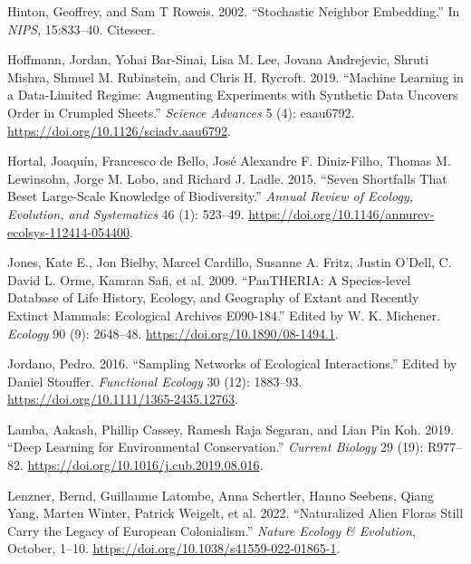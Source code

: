 \documentclass[
  letterpaper,
  DIV=11,
  numbers=noendperiod]{scrartcl}
\newlength{\cslhangindent}
\newlength{\cslentryspacingunit} %
\newenvironment{CSLReferences}[2] %
 {%
  \setlength{\parindent}{0pt}
  \ifodd #1
  \let\oldpar\par
  \def\par{\hangindent=\cslhangindent\oldpar}
  \fi
  \setlength{\parskip}{#2\cslentryspacingunit}
 }%
 {}
\begin{document}
\begin{CSLReferences}{1}{0}
\leavevmode{}%
Hinton, Geoffrey, and Sam T Roweis. 2002. {``Stochastic Neighbor
Embedding.''} In \emph{{NIPS}}, 15:833--40. {Citeseer}.

\leavevmode{}%
Hoffmann, Jordan, Yohai Bar-Sinai, Lisa M. Lee, Jovana Andrejevic,
Shruti Mishra, Shmuel M. Rubinstein, and Chris H. Rycroft. 2019.
{``Machine Learning in a Data-Limited Regime: {Augmenting} Experiments
with Synthetic Data Uncovers Order in Crumpled Sheets.''} \emph{Science
Advances} 5 (4): eaau6792. \url{https://doi.org/10.1126/sciadv.aau6792}.

\leavevmode{}%
Hortal, Joaquín, Francesco de Bello, José Alexandre F. Diniz-Filho,
Thomas M. Lewinsohn, Jorge M. Lobo, and Richard J. Ladle. 2015. {``Seven
{Shortfalls} That {Beset Large-Scale Knowledge} of {Biodiversity}.''}
\emph{Annual Review of Ecology, Evolution, and Systematics} 46 (1):
523--49. \url{https://doi.org/10.1146/annurev-ecolsys-112414-054400}.

\leavevmode{}%
Jones, Kate E., Jon Bielby, Marcel Cardillo, Susanne A. Fritz, Justin
O'Dell, C. David L. Orme, Kamran Safi, et al. 2009. {``{PanTHERIA}: A
Species‐level Database of Life History, Ecology, and Geography of Extant
and Recently Extinct Mammals: {Ecological Archives E090}‐184.''} Edited
by W. K. Michener. \emph{Ecology} 90 (9): 2648--48.
\url{https://doi.org/10.1890/08-1494.1}.

\leavevmode{}%
Jordano, Pedro. 2016. {``Sampling Networks of Ecological
Interactions.''} Edited by Daniel Stouffer. \emph{Functional Ecology} 30
(12): 1883--93. \url{https://doi.org/10.1111/1365-2435.12763}.

\leavevmode{}%
Lamba, Aakash, Phillip Cassey, Ramesh Raja Segaran, and Lian Pin Koh.
2019. {``Deep Learning for Environmental Conservation.''} \emph{Current
Biology} 29 (19): R977--82.
\url{https://doi.org/10.1016/j.cub.2019.08.016}.

\leavevmode{}%
Lenzner, Bernd, Guillaume Latombe, Anna Schertler, Hanno Seebens, Qiang
Yang, Marten Winter, Patrick Weigelt, et al. 2022. {``Naturalized Alien
Floras Still Carry the Legacy of {European} Colonialism.''} \emph{Nature
Ecology \& Evolution}, October, 1--10.
\url{https://doi.org/10.1038/s41559-022-01865-1}.


\end{CSLReferences}
\end{document}
